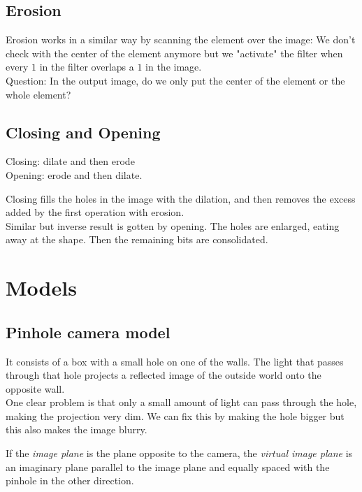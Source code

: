 \documentclass{article}
\begin{document}
\subsection{Erosion}
Erosion works in a similar way by scanning the element over the image:
We don't check with the center of the element anymore but we "activate" the filter when every $1$ in the filter overlaps a $1$ in the image.\\

Question: In the output image, do we only put the center of the element or the whole element?

\subsection{Closing and Opening}
Closing: dilate and then erode \\
Opening: erode and then dilate.

Closing fills the holes in the image with the dilation, and then removes the excess added by the first operation with erosion.\\
Similar but inverse result is gotten by opening. The holes are enlarged, eating away at the shape. Then the remaining bits are consolidated.

\section{Models}
\subsection{Pinhole camera model}
It consists of a box with a small hole on one of the walls. The light that passes through that hole projects a reflected image of the outside world onto the opposite wall.\\
One clear problem is that only a small amount of light can pass through the hole, making the projection very dim. We can fix this by making the hole bigger but this also makes the image blurry.

If the \textit{image plane} is the plane opposite to the camera, the \textit{virtual image plane} is an imaginary plane parallel to the image plane and equally spaced with the pinhole in the other direction.
\end{document}
